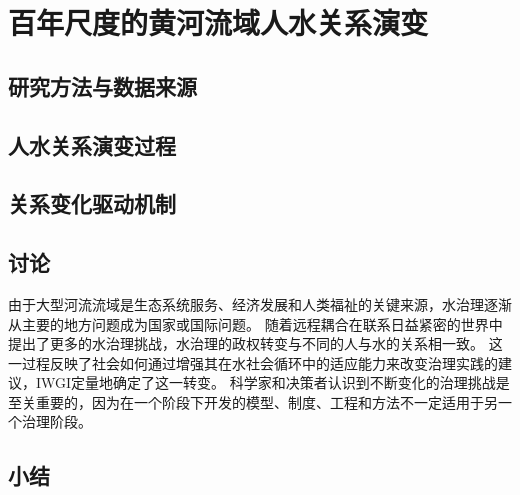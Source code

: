 \chapter{百年尺度的黄河流域人水关系演变}\label{cha:4}


\section{研究方法与数据来源}\label{ch4:methods}


\section{人水关系演变过程}\label{ch4:process}


\section{关系变化驱动机制}\label{ch4:mechanism}


\section{讨论}\label{ch4:discussion}


由于大型河流流域是生态系统服务、经济发展和人类福祉的关键来源，水治理逐渐从主要的地方问题成为国家或国际问题\cite{best2019,best2020}。
随着远程耦合在联系日益紧密的世界中提出了更多的水治理挑战，水治理的政权转变与不同的人与水的关系相一致\cite{diaz2019}。
这一过程反映了社会如何通过增强其在水社会循环中的适应能力来改变治理实践的建议，IWGI定量地确定了这一转变\cite{loch2020,turton1999}。
科学家和决策者认识到不断变化的治理挑战是至关重要的，因为在一个阶段下开发的模型、制度、工程和方法不一定适用于另一个治理阶段\cite{reyers2018}。

\section{小结}\label{ch4:summary}

